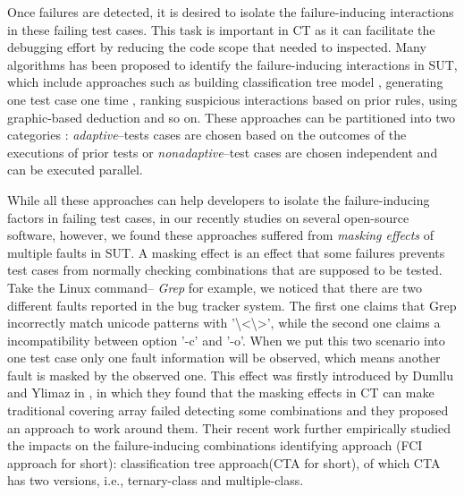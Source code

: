 \documentclass{sig-alternate}
\begin{document}
Once failures are detected, it is desired to isolate the failure-inducing interactions in these failing test cases. This task is important in CT as it can facilitate the debugging effort by reducing the code scope that needed to inspected. Many algorithms has been proposed to identify the failure-inducing interactions in SUT, which include approaches such as building classification tree model \cite{yilmaz2006covering}, generating one test case one time \cite{nie2011minimal}, ranking suspicious interactions based on prior rules\cite{ghandehari2012identifying}, using graphic-based deduction \cite{martinez2008algorithms} and so on. These approaches can be partitioned into two categories \cite{colbourn2008locating}: \emph{adaptive}--tests cases are chosen based on the outcomes of the executions of prior tests or \emph{nonadaptive}--test cases are chosen independent and can be executed parallel.

While all these approaches can help developers to isolate the failure-inducing factors in failing test cases, in our recently studies on several open-source software, however, we found these approaches suffered from \emph{masking effects} of multiple faults in SUT. A masking effect \cite{dumlu2011feedback,yilmaz2013reducing} is an effect that some failures prevents test cases from normally checking combinations that are supposed to be tested. Take the Linux command-- \emph{Grep} for example, we noticed that there are two different faults reported in the bug tracker system. The first one\cite{grepIncorrectlyMatch} claims that Grep incorrectly match unicode patterns with '\textbackslash<\textbackslash>', while the second one\cite{grepCountAndO} claims a incompatibility between option '-c' and '-o'. When we put this two scenario into one test case only one fault information will be observed, which means another fault is masked by the observed one. This effect was firstly introduced by Dumllu and Ylimaz in \cite{dumlu2011feedback}, in which they found that the masking effects in CT can make traditional covering array failed detecting some combinations and they proposed an approach to work around them. Their recent work \cite{yilmaz2013reducing} further empirically studied the impacts on the failure-inducing combinations identifying approach (FCI approach for short):  classification tree approach(CTA for short)\cite{yilmaz2006covering}, of which CTA has two versions, i.e., ternary-class and multiple-class. 

\end{document}
